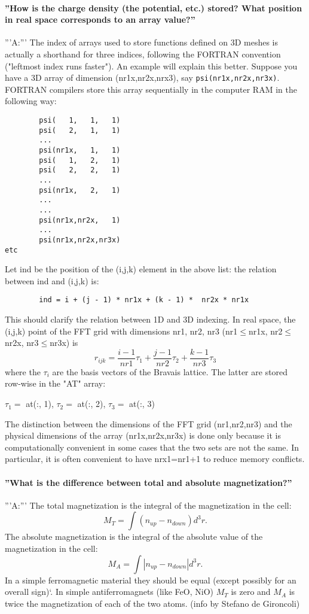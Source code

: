 \documentclass[12pt,a4paper]{article}
\begin{document}
\paragraph{ ''How is the charge density (the potential, etc.) stored? What position in real space corresponds to an array value?''}
'''A:''' The index of arrays used to store functions defined on 3D meshes is
actually a shorthand for three indices, following the FORTRAN convention 
("leftmost index runs faster"). An example will explain this better. 
Suppose you have a 3D array of dimension (nr1x,nr2x,nrx3), say 
\texttt{psi(nr1x,nr2x,nr3x)}. FORTRAN compilers store this array sequentially 
in the computer RAM in the following way:
\begin{verbatim}
        psi(   1,   1,   1)
        psi(   2,   1,   1)
        ...
        psi(nr1x,   1,   1)
        psi(   1,   2,   1)
        psi(   2,   2,   1)
        ...
        psi(nr1x,   2,   1)
        ...
        ...
        psi(nr1x,nr2x,   1)
        ...
        psi(nr1x,nr2x,nr3x)
etc
\end{verbatim}
Let ind be the position of the (i,j,k) element in the above list: the
relation between ind and (i,j,k) is:
\begin{verbatim}
        ind = i + (j - 1) * nr1x + (k - 1) *  nr2x * nr1x
\end{verbatim}
This should clarify the relation between 1D and 3D indexing. In real
space, the (i,j,k) point of the FFT grid with dimensions nr1, nr2, nr3
(nr1$\le$nr1x, nr2$\le$nr2x, nr3$\le$nr3x) is
$$
r_{ijk}=\frac{i-1}{nr1} \tau_1  +  \frac{j-1}{nr2} \tau_2 +
\frac{k-1}{nr3} \tau_3 
$$
where the $\tau_i$ are the basis vectors of the Bravais lattice. 
The latter are stored row-wise in the "AT" array:

$\tau_1 = $ at(:, 1), $\tau_2 = $ at(:, 2), $\tau_3 = $ at(:, 3)

The distinction between the dimensions of the FFT grid
(nr1,nr2,nr3) and the physical dimensions of the array
(nr1x,nr2x,nr3x) is done only because it is computationally
convenient in some cases that the two sets are not the same.
In particular, it is often convenient to have nrx1=nr1+1
to reduce memory conflicts.

\paragraph{ ''What is the difference between total and absolute
  magnetization?''} 

'''A:''' The total magnetization is the integral of the magnetization
in the cell: 
$$
M_T = \int (n_{up}-n_{down}) d^3r.
$$
The absolute magnetization is the integral of the absolute value of
the magnetization in the cell:
$$
M_A= \int |n_{up}-n_{down}| d^3r.
$$
In a simple ferromagnetic material they should be equal (except
possibly for an overall sign)`. In simple antiferromagnets (like FeO,
NiO) $M_T$ is zero and $M_A$ is twice the magnetization of each of the
two atoms. (info by Stefano de Gironcoli) 
\end{document}
